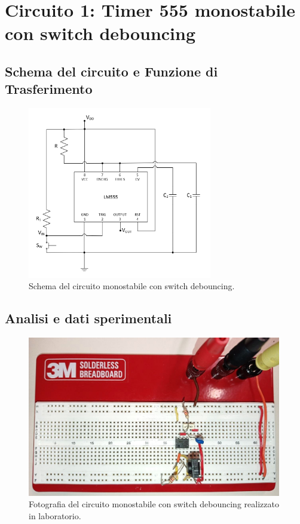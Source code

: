 \documentclass{report}
\begin{document}
\section{Circuito 1: Timer 555 monostabile con switch debouncing}
\subsection{Schema del circuito e Funzione di Trasferimento}
\begin{figure}[h!]
	\centering
	\includegraphics[height=7.5cm]{immagini/schema1}
	\caption{Schema del circuito monostabile con switch debouncing.}
	\label{figura:schema1}
\end{figure}
\subsection{Analisi e dati sperimentali}
\begin{figure}[h!]
	\centering
	\includegraphics[height=7cm]{immagini/circuito1}
	\caption{Fotografia del circuito monostabile con switch debouncing realizzato in laboratorio.}
	\label{figura:circuito1}
\end{figure}
\newpage
\end{document}

